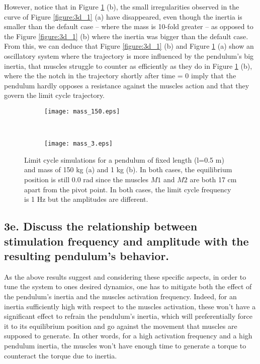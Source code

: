 \documentclass{cmc}
\begin{document}
However, notice that in Figure \ref{figure:3d_2} (b), the small irregularities observed in the curve of Figure \ref{figure:3d_1} (a) have disappeared, even though the inertia is smaller than the default case -- where the mass is 10-fold greater -- as opposed to the Figure \ref{figure:3d_1} (b) where the inertia was bigger than the default case. From this, we can deduce that Figure \ref{figure:3d_1} (b) and Figure \ref{figure:3d_2} (a) show an oscillatory system where the trajectory is more influenced by the pendulum's big inertia, that muscles struggle to counter as efficiently as they do in Figure \ref{figure:3d_2} (b), where the the notch in the trajectory shortly after time = 0 imply that the pendulum hardly opposes a resistance against the muscles action and that they govern the limit cycle trajectory.

\begin{figure}[h!]
    \centering
    \begin{subfigure}[t]{0.5\textwidth}
        \centering
        \texttt{[image: mass\_150.eps]}
        \caption{}
    \end{subfigure}%
    ~ 
    \begin{subfigure}[t]{0.5\textwidth}
        \centering
        \texttt{[image: mass\_3.eps]}
        \caption{}
    \end{subfigure}
    \caption{ Limit cycle simulations for a pendulum of fixed length (l=0.5 m) and mass of 150 kg (a) and 1 kg (b). In both cases, the equilibrium position is still 0.0 rad since the muscles $M1$ and $M2$ are both 17 cm apart from the pivot point. In both cases, the limit cycle frequency is 1 Hz but the amplitudes are different.}
    \label{figure:3d_2}
\end{figure}

\subsection*{3e. Discuss the relationship between stimulation
  frequency and amplitude with the resulting pendulum's behavior.}
\label{sec:3e}

As the above results suggest and considering these specific aspects, in order to tune the system to ones desired dynamics, one has to mitigate both the effect of the pendulum's inertia and the muscles activation frequency. Indeed, for an inertia sufficiently high with respect to the muscles activation, these won't have a significant effect to refrain the pendulum's inertia, which will preferentially force it to its equilibrium position and go against the movement that muscles are supposed to generate. In other words, for a high activation frequency and a high pendulum inertia, the muscles won't have enough time to generate a torque to counteract the torque due to inertia.
\end{document}
